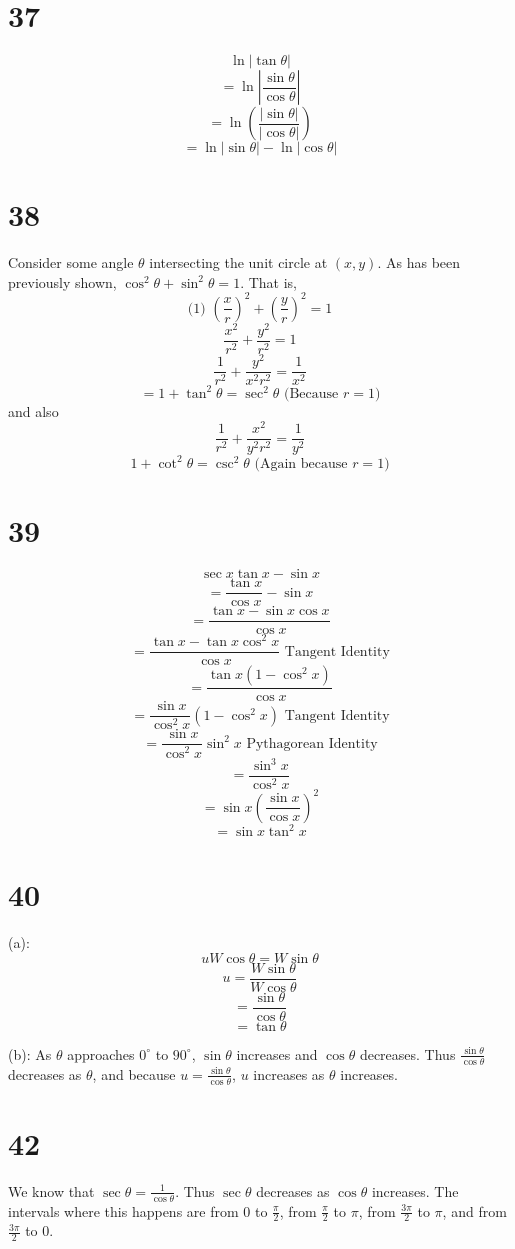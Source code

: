\documentclass{article}
\theoremstyle{definition}
\newcommand{\?}{\stackrel{?}{=}}
\begin{document}
\section*{37}
\[ \ln|\tan\theta| \]
\[ =\ln|\frac{\sin\theta}{\cos\theta}| \]
\[ =\ln(\frac{|\sin\theta|}{|\cos\theta|}) \]
\[ =\ln|\sin\theta|-\ln|\cos\theta| \]

\section*{38}
Consider some angle $\theta$ intersecting the unit circle at $(x,y)$. As has been previously shown, $\cos^2\theta+\sin^2\theta=1$. That is,
\[ \textrm{(1) }(\frac{x}{r})^2+(\frac{y}{r})^2=1 \]
\[ \frac{x^2}{r^2}+\frac{y^2}{r^2}=1 \]
\[ \frac{1}{r^2}+\frac{y^2}{x^2r^2}=\frac{1}{x^2} \]
\[ =1+\tan^2\theta=\sec^2\theta\textrm{ (Because $r=1$)} \]
and also
\[ \frac{1}{r^2}+\frac{x^2}{y^2r^2}=\frac{1}{y^2} \]
\[ 1+\cot^2\theta=\csc^2\theta\textrm{ (Again because $r=1$)} \]

\section*{39}
\[ \sec x\tan x-\sin x \]
\[ =\frac{\tan x}{\cos x}-\sin x \]
\[ =\frac{\tan x-\sin x\cos x}{\cos x} \]
\[ =\frac{\tan x-\tan x\cos^2 x}{\cos x}\textrm{ Tangent Identity} \]
\[ =\frac{\tan x(1-\cos^2 x)}{\cos x} \]
\[ =\frac{\sin x}{\cos^2 x}(1-\cos^2 x)\textrm{ Tangent Identity} \]
\[ =\frac{\sin x}{\cos^2 x}\sin^2 x\textrm{ Pythagorean Identity} \]
\[ =\frac{\sin^3 x}{\cos^2 x} \]
\[ =\sin x(\frac{\sin x}{\cos x})^2 \]
\[ =\sin x\tan^2 x \]

\section*{40}
(a): \[ uW\cos\theta=W\sin\theta \]
\[ u=\frac{W\sin\theta}{W\cos\theta} \]
\[ =\frac{\sin\theta}{\cos\theta} \]
\[ =\tan\theta \]


(b): As $\theta$ approaches $0^\circ$ to $90^\circ$, $\sin\theta$ increases and $\cos\theta$ decreases. Thus $\frac{\sin\theta}{\cos\theta}$ decreases as 
$\theta$, and because $u=\frac{\sin\theta}{\cos\theta}$, $u$ increases as $\theta$ increases.


\section*{42}
We know that $\sec\theta=\frac{1}{\cos\theta}$. Thus $\sec\theta$ decreases as $\cos\theta$ increases. 
The intervals where this happens are from $0$ to $\frac{\pi}{2}$, 
from $\frac{\pi}{2}$ to $\pi$, from $\frac{3\pi}{2}$ to $\pi$, and from $\frac{3\pi}{2}$ to $0$.
\end{document}

